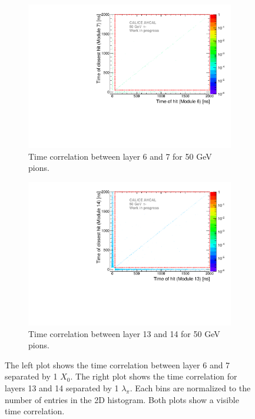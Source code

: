 \begin{figure}[htbp!]
	\begin{subfigure}[t]{0.5\textwidth}
		\centering
		\includegraphics[width=1\textwidth]{../Thesis_Plots/Timing/Pions/Plots/Time_Correlation_short.pdf}
		\caption{Time correlation between layer 6 and 7 for 50 GeV pions.} \label{fig:Time_Corr_short}
	\end{subfigure}
	\hfill
	\begin{subfigure}[t]{0.5\textwidth}
		\centering
		\includegraphics[width=1\textwidth]{../Thesis_Plots/Timing/Pions/Plots/Time_Correlation_long.pdf}
		\caption{Time correlation between layer 13 and 14 for 50 GeV pions.}\label{fig:Time_Corr_long}
	\end{subfigure}
	\caption{The left plot shows the time correlation between layer 6 and 7 separated by 1 $X_0$. The right plot shows the time correlation for layers 13 and 14 separated by 1 $\lambda_{\pi}$. Each bins are normalized to the number of entries in the 2D histogram. Both plots show a visible time correlation.}
	\label{fig:TimeCorrelation}
\end{figure}

